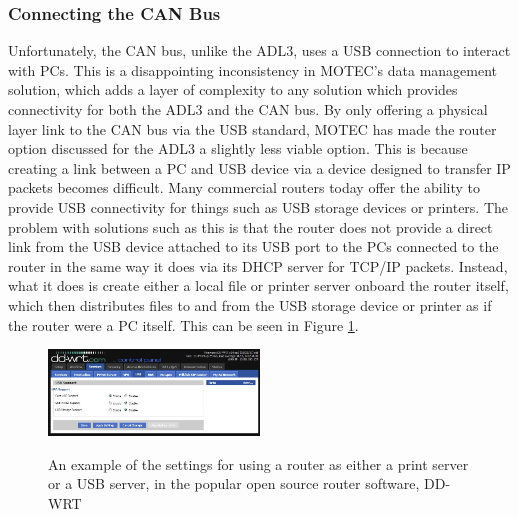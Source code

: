 \subsubsection{Connecting the CAN Bus}
Unfortunately, the CAN bus, unlike the ADL3, uses a USB connection to interact with PCs\cite{MAN_UTC}. This is a disappointing inconsistency in MOTEC's data management solution, which adds a layer of complexity to any solution which provides connectivity for both the ADL3 and the CAN bus. By only offering a physical layer link to the CAN bus via the USB standard, MOTEC has made the router option discussed for the ADL3 a slightly less viable option. This is because creating a link between a PC and USB device via a device designed to transfer IP packets becomes difficult. Many commercial routers today offer the ability to provide USB connectivity for things such as USB storage devices or printers\cite{REV_ROUTERS}. The problem with solutions such as this is that the router does not provide a direct link from the USB device attached to its USB port to the PCs connected to the router in the same way it does via its DHCP server for TCP/IP packets. Instead, what it does is create either a local file or printer server onboard the router itself, which then distributes files to and from the USB storage device or printer as if the router were a PC itself. This can be seen in Figure \ref{TEL_usb_printer_support}.

\begin{figure}[h!]
  \caption{An example of the settings for using a router as either a print server or a USB server, in the popular open source router software, DD-WRT}
  \centering
    \includegraphics[width=0.5\textwidth]{Images/Telemetry/TEL_usb_printer_support.jpg}
    \label{TEL_usb_printer_support}
\end{figure}

